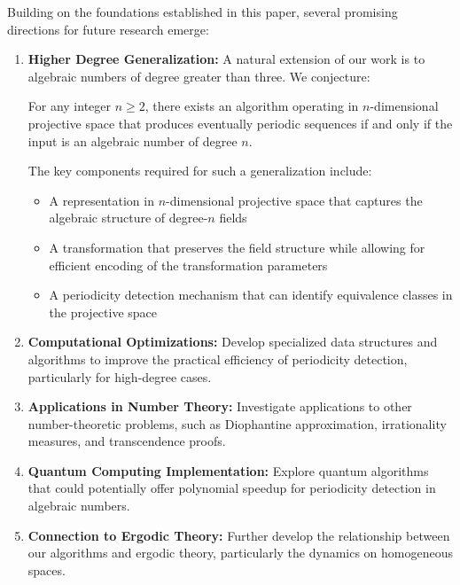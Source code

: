 Building on the foundations established in this paper, several promising directions for future research emerge:

\begin{enumerate}
\item \textbf{Higher Degree Generalization:} A natural extension of our work is to algebraic numbers of degree greater than three. We conjecture:

\begin{conjecture}\label{conj:higher_degree}
For any integer $n \geq 2$, there exists an algorithm operating in $n$-dimensional projective space that produces eventually periodic sequences if and only if the input is an algebraic number of degree $n$.
\end{conjecture}

The key components required for such a generalization include:
\begin{itemize}
\item A representation in $n$-dimensional projective space that captures the algebraic structure of degree-$n$ fields
\item A transformation that preserves the field structure while allowing for efficient encoding of the transformation parameters
\item A periodicity detection mechanism that can identify equivalence classes in the projective space
\end{itemize}

\item \textbf{Computational Optimizations:} Develop specialized data structures and algorithms to improve the practical efficiency of periodicity detection, particularly for high-degree cases.

\item \textbf{Applications in Number Theory:} Investigate applications to other number-theoretic problems, such as Diophantine approximation, irrationality measures, and transcendence proofs.

\item \textbf{Quantum Computing Implementation:} Explore quantum algorithms that could potentially offer polynomial speedup for periodicity detection in algebraic numbers.

\item \textbf{Connection to Ergodic Theory:} Further develop the relationship between our algorithms and ergodic theory, particularly the dynamics on homogeneous spaces.
\end{enumerate}

